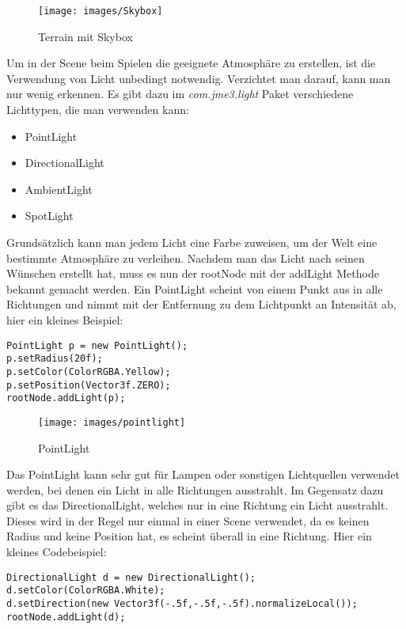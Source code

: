 \begin{figure}[h!]
		
		\centering\texttt{[image: images/Skybox]}
		\caption{Terrain mit Skybox} \cite{Abb4}
		
\end{figure} 
\newpage



Um in der Scene beim Spielen die geeignete Atmosphäre zu erstellen, ist die Verwendung von Licht unbedingt notwendig. Verzichtet man darauf, kann man nur wenig erkennen. Es gibt dazu im \emph{com.jme3.light} Paket verschiedene Lichttypen, die man verwenden kann:
\begin{itemize}
	\item PointLight
	\item DirectionalLight
	\item AmbientLight
	\item SpotLight
\end{itemize}
Grundsätzlich kann man jedem Licht eine Farbe zuweisen, um der Welt eine bestimmte Atmosphäre zu verleihen. Nachdem man das Licht nach seinen Wünschen erstellt hat, muss es nun der rootNode mit der addLight Methode bekannt gemacht werden. Ein PointLight scheint von einem Punkt aus in alle Richtungen und nimmt mit der Entfernung zu dem Lichtpunkt an Intensität ab, hier ein kleines Beispiel:
\begin{lstlisting}
PointLight p = new PointLight();
p.setRadius(20f);
p.setColor(ColorRGBA.Yellow);
p.setPosition(Vector3f.ZERO);
rootNode.addLight(p);
\end{lstlisting}

\begin{figure}[h!]
	
	
	
	\centering\texttt{[image: images/pointlight]} 
	\caption{PointLight}\cite{Abb567}
	
\end{figure}
Das PointLight kann sehr gut für Lampen oder sonstigen Lichtquellen verwendet werden, bei denen ein Licht in alle Richtungen ausstrahlt. Im Gegensatz dazu gibt es das DirectionalLight, welches nur in eine Richtung ein Licht ausstrahlt. Dieses wird in der Regel nur einmal in einer Scene verwendet, da es keinen Radius und keine Position hat, es scheint überall in eine Richtung. Hier ein kleines Codebeispiel:
\begin{lstlisting}
DirectionalLight d = new DirectionalLight();
d.setColor(ColorRGBA.White);
d.setDirection(new Vector3f(-.5f,-.5f,-.5f).normalizeLocal());
rootNode.addLight(d);
\end{lstlisting}

